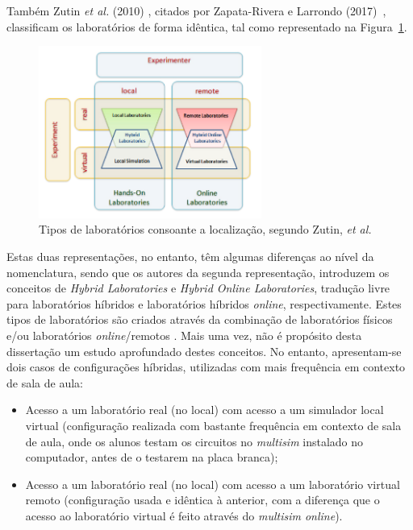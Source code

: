 Também Zutin \textit{et al.} (2010) \cite{zutinlab2go}, citados por Zapata-Rivera e Larrondo (2017)~\cite{Zapata-Rivera}, classificam os laboratórios de forma idêntica, tal como representado na Figura~\ref{fig:classificaçãozutin}.

\begin{figure}[hbtp]
    \centering
    \includegraphics[width=0.65\textwidth]{figures/carac_lab.png}
    \caption{Tipos de laboratórios consoante a localização, segundo Zutin, \textit{et al.} \cite{zutinlab2go}}
    \label{fig:classificaçãozutin}
\end{figure}

Estas duas representações, no entanto, têm algumas diferenças ao nível da nomenclatura, sendo que os autores da segunda representação, introduzem os conceitos de \textit{Hybrid Laboratories} e \textit{Hybrid Online Laboratories}, tradução livre para laboratórios híbridos e laboratórios híbridos \textit{online}, respectivamente. Estes tipos de laboratórios são criados através da combinação de laboratórios físicos e/ou laboratórios \textit{online}/remotos \cite{Zapata-Rivera}. Mais uma vez, não é propósito desta dissertação um estudo aprofundado destes conceitos. No entanto, apresentam-se dois casos de configurações híbridas, utilizadas com mais frequência em contexto de sala de aula:

\begin{itemize}
    \item Acesso a um laboratório real (no local) com acesso a um simulador local virtual (configuração realizada com bastante frequência em contexto de sala de aula, onde os alunos testam os circuitos no \textit{multisim} instalado no computador, antes de o testarem na placa branca);
    \item Acesso a um laboratório real (no local) com acesso a um laboratório virtual remoto (configuração usada e idêntica à anterior, com a diferença que o acesso ao laboratório virtual é feito através do \textit{multisim online}).
\end{itemize}

